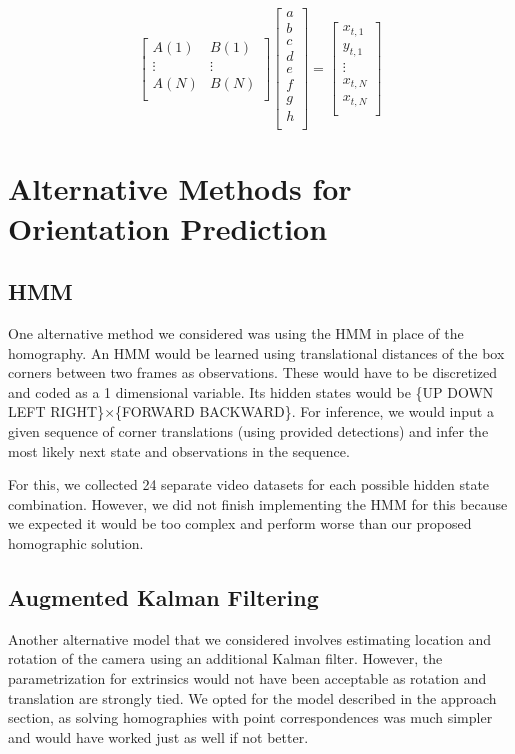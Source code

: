 \documentclass[letterpaper,10pt,conference]{IEEEtran}
\begin{document}
\begin{equation}
\begin{bmatrix}
A(1)& B(1)\\
\vdots&\vdots\\
A(N)& B(N) \\
\end{bmatrix}
\begin{bmatrix}
a\\
b\\
c\\
d\\
e\\
f\\
g\\
h\\
\end{bmatrix} = 
\begin{bmatrix}
x_{t,1}\\
y_{t,1}\\
\vdots\\
x_{t,N}\\
x_{t,N}\\
\end{bmatrix}
\end{equation}



\section{Alternative Methods for Orientation Prediction}
\subsection{HMM}
One alternative method we considered was using the HMM in place of the homography. An HMM would be learned using translational distances of the box corners between two frames as observations. These would have to be discretized and coded as a 1 dimensional variable. Its hidden states would be \{UP DOWN LEFT RIGHT\}$\times$\{FORWARD BACKWARD\}. For inference, we would input a given sequence of corner translations (using provided detections) and infer the most likely next state and observations in the sequence.

For this, we collected 24 separate video datasets for each possible hidden state combination. However, we did not finish implementing the HMM for this because we expected it would be too complex and perform worse than our proposed homographic solution.

\subsection{Augmented Kalman Filtering}
Another alternative model that we considered involves estimating location and rotation of the camera using an additional Kalman filter.  However, the parametrization for extrinsics would not have been acceptable as rotation and translation are strongly tied.  We opted for the model described in the approach section, as solving homographies with point correspondences was much simpler and would have worked just as well if not better.
\end{document}
